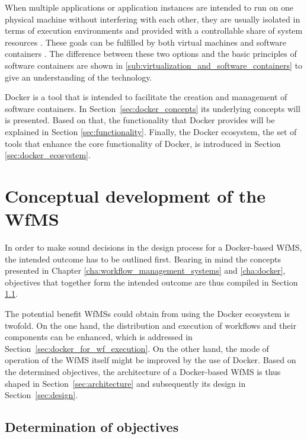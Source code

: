 \documentclass[language=english,noinputenc]{wiwwuwordrprt}
\begin{document}
    When multiple applications or application instances are intended to run on one physical machine without interfering with each other, they are usually isolated in terms of execution environments and provided with a controllable share of system resources \cite{Felter2014Updated}. These goals can be fulfilled by both virtual machines and software containers \cite{Ruiz2015Performance}. The difference between these two options and the basic principles of software containers are shown in \ref{sub:virtualization_and_software_containers} to give an understanding of the technology.

    Docker is a tool that is intended to facilitate the creation and management of software containers. In Section~\ref{sec:docker_concepts} its underlying concepts will is presented. Based on that, the functionality that Docker provides will be explained in Section \ref{sec:functionality}. Finally, the Docker ecosystem, \ie the set of tools that enhance the core functionality of Docker, is introduced in Section \ref{sec:docker_ecosystem}.

    

  \chapter{Conceptual development of the \ac{WfMS}} %
    \label{cha:solution_design}

    In order to make sound decisions in the design process for a Docker-based \ac{WfMS}, the intended outcome has to be outlined first. Bearing in mind the concepts presented in Chapter \ref{cha:workflow_management_systems} and \ref{cha:docker}, objectives that together form the intended outcome are thus compiled in Section \ref{sec:determination_of_objectives}.

    The potential benefit \acp{WfMS} could obtain from using the Docker ecosystem is twofold.
    On the one hand, the distribution and execution of workflows and their components can be enhanced, which is addressed in Section~\ref{sec:docker_for_wf_execution}.
    On the other hand, the mode of operation of the \ac{WfMS} itself might be improved by the use of Docker.
    Based on the determined objectives, the architecture of a Docker-based \ac{WfMS} is thus shaped in Section~\ref{sec:architecture} and subsequently its design in Section~\ref{sec:design}.

    \section{Determination of objectives} %
      \label{sec:determination_of_objectives}
\end{document}
